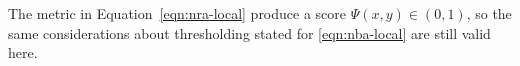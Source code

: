 





The metric in Equation~\ref{eqn:nra-local} produce a score $\Psi(x,y) \in (0,1)$, so the same considerations about thresholding stated for \ref{eqn:nba-local} are still valid here.